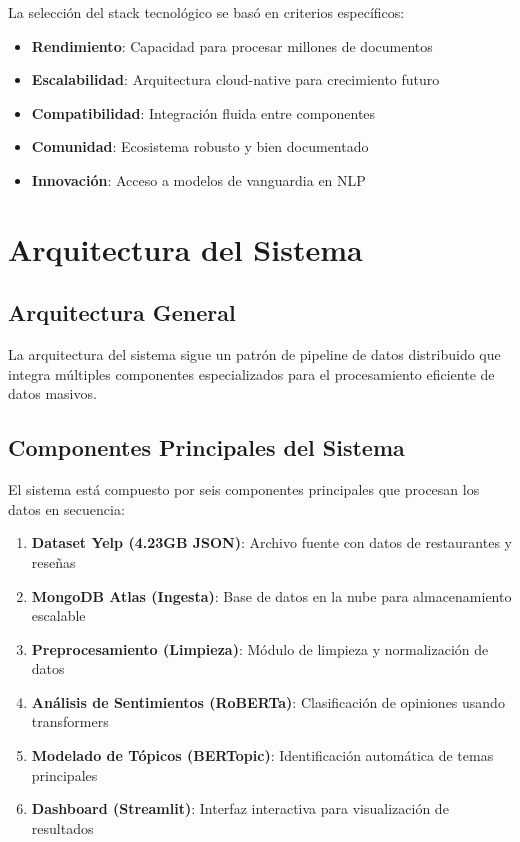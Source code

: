 \documentclass[12pt,a4paper,twoside,openany]{book}
\begin{document}
La selección del stack tecnológico se basó en criterios específicos:

\begin{itemize}
    \item \textbf{Rendimiento}: Capacidad para procesar millones de documentos
    \item \textbf{Escalabilidad}: Arquitectura cloud-native para crecimiento futuro
    \item \textbf{Compatibilidad}: Integración fluida entre componentes
    \item \textbf{Comunidad}: Ecosistema robusto y bien documentado
    \item \textbf{Innovación}: Acceso a modelos de vanguardia en NLP
\end{itemize}

\section{Arquitectura del Sistema}

\subsection{Arquitectura General}

La arquitectura del sistema sigue un patrón de pipeline de datos distribuido que integra múltiples componentes especializados para el procesamiento eficiente de datos masivos.

\subsection{Componentes Principales del Sistema}

El sistema está compuesto por seis componentes principales que procesan los datos en secuencia:

\begin{enumerate}
    \item \textbf{Dataset Yelp (4.23GB JSON)}: Archivo fuente con datos de restaurantes y reseñas
    \item \textbf{MongoDB Atlas (Ingesta)}: Base de datos en la nube para almacenamiento escalable
    \item \textbf{Preprocesamiento (Limpieza)}: Módulo de limpieza y normalización de datos
    \item \textbf{Análisis de Sentimientos (RoBERTa)}: Clasificación de opiniones usando transformers
    \item \textbf{Modelado de Tópicos (BERTopic)}: Identificación automática de temas principales
    \item \textbf{Dashboard (Streamlit)}: Interfaz interactiva para visualización de resultados
\end{enumerate}
\end{document}
